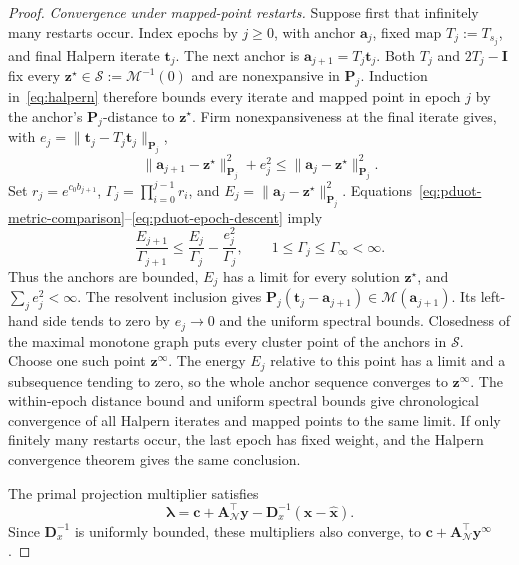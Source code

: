 \begin{proof}
\par\smallskip\noindent\textit{Convergence under mapped-point restarts.}
Suppose first that infinitely many restarts occur.
Index epochs by $j\geq0$, with anchor $\mathbf a_j$, fixed map $T_j:=T_{s_j}$, and final Halpern iterate $\mathbf t_j$.
The next anchor is $\mathbf a_{j+1}=T_j\mathbf t_j$.
Both $T_j$ and $2T_j-\mathbf I$ fix every $\mathbf z^\star\in\mathcal S:=\mathcal M^{-1}(0)$ and are nonexpansive in $\mathbf P_j$.
Induction in~\eqref{eq:halpern} therefore bounds every iterate and mapped point in epoch $j$ by the anchor's $\mathbf P_j$-distance to $\mathbf z^\star$.
Firm nonexpansiveness at the final iterate gives, with $e_j=\|\mathbf t_j-T_j\mathbf t_j\|_{\mathbf P_j}$,
\begin{equation}
\label{eq:pduot-epoch-descent}
\|\mathbf a_{j+1}-\mathbf z^\star\|_{\mathbf P_j}^2+e_j^2\leq\|\mathbf a_j-\mathbf z^\star\|_{\mathbf P_j}^2.
\end{equation}
Set $r_j=e^{c_0b_{j+1}}$, $\Gamma_j=\prod_{i=0}^{j-1}r_i$, and $E_j=\|\mathbf a_j-\mathbf z^\star\|_{\mathbf P_j}^2$.
Equations~\eqref{eq:pduot-metric-comparison}--\eqref{eq:pduot-epoch-descent} imply
\begin{equation*}
\frac{E_{j+1}}{\Gamma_{j+1}}\leq\frac{E_j}{\Gamma_j}-\frac{e_j^2}{\Gamma_j},\qquad 1\leq\Gamma_j\leq\Gamma_\infty<\infty.
\end{equation*}
Thus the anchors are bounded, $E_j$ has a limit for every solution $\mathbf z^\star$, and $\sum_je_j^2<\infty$.
The resolvent inclusion gives $\mathbf P_j(\mathbf t_j-\mathbf a_{j+1})\in\mathcal M(\mathbf a_{j+1})$.
Its left-hand side tends to zero by $e_j\to0$ and the uniform spectral bounds.
Closedness of the maximal monotone graph puts every cluster point of the anchors in $\mathcal S$.
Choose one such point $\mathbf z^\infty$.
The energy $E_j$ relative to this point has a limit and a subsequence tending to zero, so the whole anchor sequence converges to $\mathbf z^\infty$.
The within-epoch distance bound and uniform spectral bounds give chronological convergence of all Halpern iterates and mapped points to the same limit.
If only finitely many restarts occur, the last epoch has fixed weight, and the Halpern convergence theorem gives the same conclusion.

The primal projection multiplier satisfies
\begin{equation*}
\boldsymbol\lambda=\mathbf c+\mathbf A_{\mathcal N}^{\top}\mathbf y-\mathbf D_x^{-1}(\mathbf x-\widehat{\mathbf x}).
\end{equation*}
Since $\mathbf D_x^{-1}$ is uniformly bounded, these multipliers also converge, to $\mathbf c+\mathbf A_{\mathcal N}^{\top}\mathbf y^\infty$.
\end{proof}

